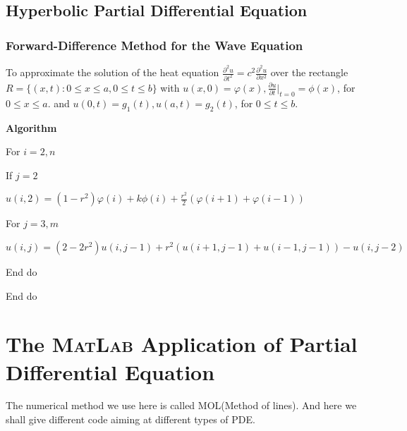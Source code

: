 \documentclass[a4paper]{article}
\newcommand{\tmtextbf}[1]{{\bfseries{#1}}}
\newcommand{\tmtextup}[1]{{\upshape{#1}}}
\newenvironment{tmindent}{\begin{tmparmod}{1.5em}{0pt}{0pt} }{\end{tmparmod}}
\newenvironment{tmparmod}[3]{\begin{list}{}{\setlength{\topsep}{0pt}\setlength{\leftmargin}{#1}\setlength{\rightmargin}{#2}\setlength{\parindent}{#3}\setlength{\listparindent}{\parindent}\setlength{\itemindent}{\parindent}\setlength{\parsep}{\parskip}} \item[]}{\end{list}}
\newenvironment{tmparsep}[1]{\begingroup\setlength{\parskip}{#1}}{\endgroup}
\begin{document}
\subsection{Hyperbolic Partial Differential Equation}

\subsubsection{Forward-Difference Method for the Wave Equation}

To approximate the solution of the heat equation $\frac{\partial^2 u}{\partial
t^2} = c^2 \frac{\partial^2 u}{\partial x^2}$ over the rectangle $R =\{(x, t)
: 0 \leqslant x \leqslant a, 0 \leqslant t \leqslant b\}$ with $u \left( x, 0
\right) = \varphi \left( x \right), \frac{\partial u}{\partial t} |_{t = 0} =
\phi \left( x \right)$, for $0 \leqslant x \leqslant a$. and $u \left( 0, t
\right) = g_1 \left( t \right), u \left( a, t \right) = g_2 \left( t \right)$,
for $0 \leqslant t \leqslant b$.

{\noindent}\begin{tmparsep}{0em}
  \tmtextbf{Algorithm \tmtextup{4}}{\smallskip}
  \begin{tmindent}
    For $i = 2, n$

    If $j = 2$

    $u \left( i, 2 \right) = \left( 1 - r^2 \right) \varphi \left( i \right) +
    k \phi \left( i \right) + \frac{r^2}{2} \left( \varphi \left( i + 1
    \right) + \varphi \left( i - 1 \right) \right)$

    For $j = 3, m$

    $u \left( i, j \right) = \left( 2 - 2 r^2 \right) u \left( i, j - 1
    \right) + r^2 \left( u \left( i + 1, j - 1 \right) + u \left( i - 1, j - 1
    \right) \right) - u \left( i, j - 2 \right)$

    End do

    End do
  \end{tmindent}
\end{tmparsep}{\hspace*{\fill}}{\medskip}

\section{The \textsc{MatLab} Application of Partial Differential Equation}


The numerical method we use here is called MOL(Method of lines). And here we shall give different code aiming at different types of PDE.
\\
\end{document}
